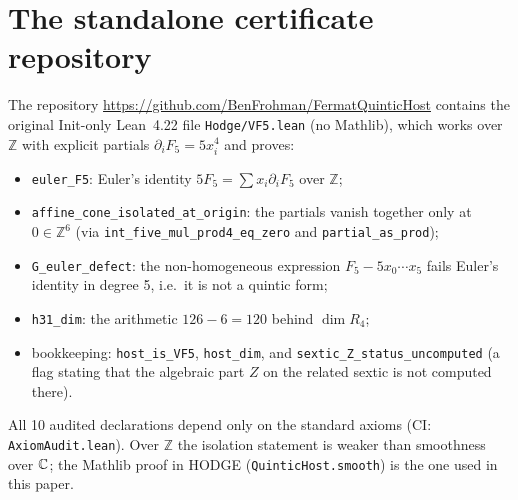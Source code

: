 \documentclass[11pt]{article}
\theoremstyle{definition}\newtheorem{definition}[theorem]{Definition}\newtheorem{remark}[theorem]{Remark}
\begin{document}
\section{The standalone certificate repository}
The repository \url{https://github.com/BenFrohman/FermatQuinticHost} contains the original Init-only
Lean~4.22 file \texttt{Hodge/VF5.lean} (no Mathlib), which works over $\mathbb Z$ with explicit partials
$\partial_iF_5=5x_i^4$ and proves:
\begin{itemize}
\item \texttt{euler\_F5}: Euler's identity $5F_5=\sum x_i\partial_iF_5$ over $\mathbb Z$;
\item \texttt{affine\_cone\_isolated\_at\_origin}: the partials vanish together only at $0\in\mathbb Z^6$
(via \texttt{int\_five\_mul\_prod4\_eq\_zero} and \texttt{partial\_as\_prod});
\item \texttt{G\_euler\_defect}: the non-homogeneous expression $F_5-5x_0\cdots x_5$ fails Euler's identity
in degree 5, i.e.\ it is not a quintic form;
\item \texttt{h31\_dim}: the arithmetic $126-6=120$ behind $\dim R_4$;
\item bookkeeping: \texttt{host\_is\_VF5}, \texttt{host\_dim}, and \texttt{sextic\_Z\_status\_uncomputed}
(a flag stating that the algebraic part $Z$ on the related sextic is not computed there).
\end{itemize}
All 10 audited declarations depend only on the standard axioms (CI: \texttt{AxiomAudit.lean}). Over $\mathbb Z$
the isolation statement is weaker than smoothness over $\mathbb{C}$; the Mathlib proof in HODGE
(\texttt{QuinticHost.smooth}) is the one used in this paper.
\end{document}
